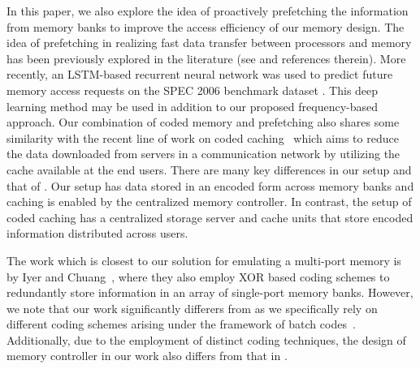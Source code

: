 In this paper, we also explore the idea of proactively prefetching the information from memory banks to improve the access efficiency of our memory design. The idea of prefetching in realizing fast data transfer between processors and memory has been previously explored in the literature (see \cite{Kim2016, Kadjo2014, Shevgoor2015, JL2013} and references therein). 
More recently, an LSTM-based recurrent neural network was used to predict future memory access requests on the SPEC 2006 benchmark dataset \cite{lstm2018}. This deep learning method may be used in addition to our proposed frequency-based approach.
Our combination of coded memory and prefetching also shares some similarity with the recent line of work on coded caching~\cite{MN16a} which aims to reduce the data downloaded from servers in a communication network by utilizing the cache available at the end users. There are many key differences in our setup and that of \cite{MN16a}. Our setup has data stored in an encoded form across memory banks and caching is enabled by the centralized memory controller. In contrast, the setup of coded caching has a centralized storage server and cache units that store encoded information distributed across users.

The work which is closest to our solution for emulating a multi-port memory is by Iyer and Chuang~\cite{Memoir_xor, Memoir_xor_virtual}, where they also employ XOR based coding schemes to redundantly store information in an array of single-port memory banks. However, we note that our work significantly differers from \cite{Memoir_xor, Memoir_xor_virtual} as we specifically rely on different coding schemes arising under the framework of batch codes~\cite{batchcodes}. Additionally, due to the employment of distinct coding techniques, the design of memory controller in our work also differs from that in \cite{Memoir_xor, Memoir_xor_virtual}.

